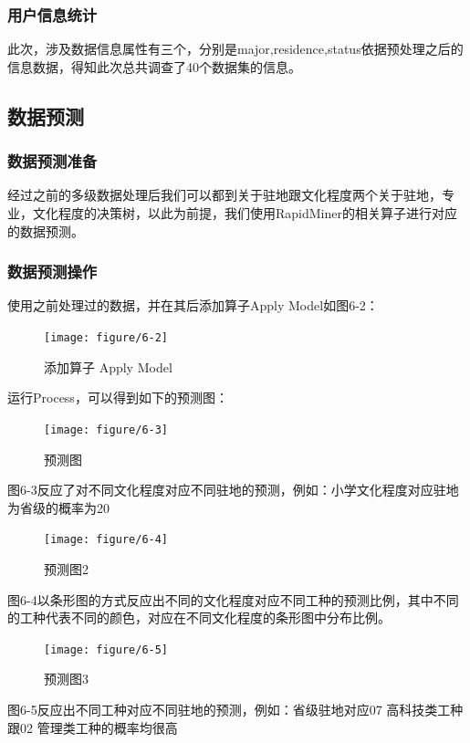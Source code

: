\subsubsection{用户信息统计}
此次，涉及数据信息属性有三个，分别是major,residence,status依据预处理之后的信息数据，得知此次总共调查了40个数据集的信息。

\subsection{数据预测}

\subsubsection{数据预测准备}
 经过之前的多级数据处理后我们可以都到关于驻地跟文化程度两个关于驻地，专业，文化程度的决策树，以此为前提，我们使用RapidMiner的相关算子进行对应的数据预测。

\subsubsection{数据预测操作}
使用之前处理过的数据，并在其后添加算子Apply Model如图6-2：

\begin{figure}[thbp!]
	\centering
	\texttt{[image: figure/6-2]}
	\caption{添加算子 Apply Model}
	\label{fig:6-2}
\end{figure}

运行Process，可以得到如下的预测图：

\begin{figure}[thbp!]
	\centering
	\texttt{[image: figure/6-3]}
	\caption{预测图}
	\label{fig:6-3}
\end{figure}

图6-3反应了对不同文化程度对应不同驻地的预测，例如：小学文化程度对应驻地为省级的概率为20%

\begin{figure}[thbp!]
	\centering
	\texttt{[image: figure/6-4]}
	\caption{预测图2}
	\label{fig:6-4}
\end{figure}

图6-4以条形图的方式反应出不同的文化程度对应不同工种的预测比例，其中不同的工种代表不同的颜色，对应在不同文化程度的条形图中分布比例。

\begin{figure}[thbp!]
	\centering
	\texttt{[image: figure/6-5]}
	\caption{预测图3}
	\label{fig:6-5}
\end{figure}

图6-5反应出不同工种对应不同驻地的预测，例如：省级驻地对应07 高科技类工种跟02 管理类工种的概率均很高

